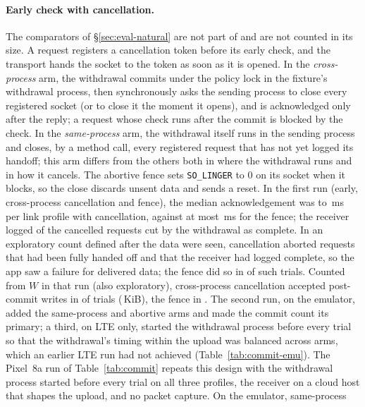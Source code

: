 \paragraph{Early check with cancellation.}\label{app:cancel} The comparators of \S\ref{sec:eval-natural} are not part of
\sys and are not counted in its size. A request registers a cancellation token before its early check, and the transport
hands the socket to the token as soon as it is opened. In the \emph{cross-process} arm, the withdrawal commits under the
policy lock in the fixture's withdrawal process, then synchronously asks the sending process to close every registered
socket (or to close it the moment it opens), and is acknowledged only after the reply; a request whose check runs after
the commit is blocked by the check. In the \emph{same-process} arm, the withdrawal itself runs in the sending process and
closes, by a method call, every registered request that has not yet logged its handoff; this arm differs from the others
both in where the withdrawal runs and in how it cancels. The abortive fence sets \texttt{SO\_LINGER} to 0 on its socket
when it blocks, so the close discards unsent data and sends a reset. In the first run (early, cross-process cancellation
and fence), the median acknowledgement was \gcloseAckLo{} to \gcloseAckHi{}\,ms per link profile with cancellation,
against at most \gcloseFenceAck{}\,ms for the fence; the receiver logged \gcloseCutComplete{} of the \gcloseCut{}
cancelled requests cut by the withdrawal as complete. In an exploratory count defined after the data were seen,
cancellation aborted \gcloseAbortDelivered{} requests that had been fully handed off and that the receiver had logged
complete, so the app saw a failure for delivered data; the fence did so in \gcloseFenceAbortDelivered{} of
\gcloseFenceDelivered{} such trials. Counted from $W$ in that run (also exploratory), cross-process cancellation accepted
post-commit writes in \gcloseCommitClose{} of \gcloseN{} trials (\gcloseCommitCloseKib{}\,KiB), the fence in
\gcloseCommitFence{}. The second run, on the emulator, added the same-process and abortive arms and made the commit count
its primary; a third, on LTE only, started the withdrawal process before every trial so that the withdrawal's timing
within the upload was balanced across arms, which an earlier LTE run had not achieved (Table~\ref{tab:commit-emu}). The
Pixel~8a run of Table~\ref{tab:commit} repeats this design with the withdrawal process started before every trial on all
three profiles, the receiver on a cloud host that shapes the upload, and no packet capture. On the emulator, same-process

